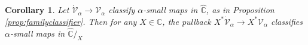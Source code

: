 \documentclass[11pt]{amsart}
\newcommand{\C}{\ensuremath{\boxempty}}
\newcommand{\bbC}{\ensuremath{\mathbb{C}}}
\newcommand{\Set}{\ensuremath{\mathsf{Set}}}
\newcommand{\Cat}{\ensuremath{\mathsf{Cat}}}
\newcommand{\op}[1]{\ensuremath{{#1}^{\mathrm{op}}}}
\newcommand{\hook}{\ensuremath{\hookrightarrow}}
\newcommand{\mono}{\ensuremath{\rightarrowtail}}
\renewcommand{\to}{\ensuremath{\rightarrow}}
\newcommand{\too}{\ensuremath{\longrightarrow}}
\newcommand{\V}{\ensuremath{\mathcal{V}}}
\newcommand{\VV}{\ensuremath{\dot{\mathcal{V}}}}
\newcommand{\SSet}{\ensuremath{\,\dot{\Set}}}
\newtheorem{corollary}[theorem]{Corollary}
\theoremstyle{remark}
\theoremstyle{definition}
\newcommand{\pbmark}{\ar[dr, phantom, "\lrcorner" very near start, shift right=.5ex]}	%
\begin{document}
\begin{enumerate}
%    
\end{enumerate}

 \begin{corollary}\label{prop:familyclassifierforslices}
Let $\VV_\alpha\to\V_\alpha$ classify $\alpha$-small maps in $\widehat{\bbC}$, as in Proposition \ref{prop:familyclassifier}.  Then for any $X\in \bbC$, the pullback $X^*\VV_\alpha\to X^*\V_\alpha$ classifies 
$\alpha$-small maps in $\widehat{\bbC}/_X$
\end{corollary}
\end{document}
